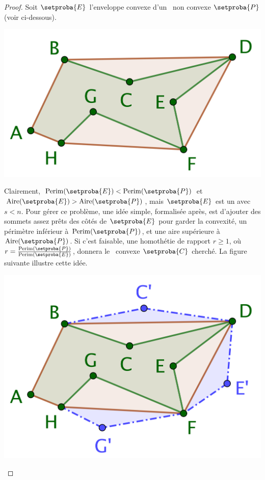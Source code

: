 \begin{proof}
	Soit $\setproba{E}$ l'enveloppe convexe d'un \ngone\ non convexe $\setproba{P}$ (voir ci-dessous).
	
	\begin{center}
		\centering
		\small\itshape
		\includegraphics[scale=.45]{content/polygon/sol-must-be/convex-hull.png}
	\end{center}
	
		
	Clairement,
	$\perim{\setproba{E}} < \perim{\setproba{P}}$
	et
	$\area{\setproba{E}} > \area{\setproba{P}}$,
	mais
	$\setproba{E}$ est un  avec $s < n$. 
	Pour gérer ce problème, une idée simple, formalisée après, est d'ajouter des sommets assez prêts des côtés de $\setproba{E}$ pour garder 
	la convexité, 
	un périmètre inférieur à $\perim{\setproba{P}}$, 
	et
	une aire supérieure à $\area{\setproba{P}}$.
	Si c'est faisable, une homothétie de rapport $r \geq 1$, où $r = \frac{ \perim{\setproba{P}} }{ \perim{\setproba{E}} }$, donnera le \ngone\ convexe $\setproba{C}$ cherché.
	La figure suivante illustre cette idée.
	
	\begin{center}
		\includegraphics[scale=.45]{content/polygon/sol-must-be/convex-hull-distortion.png}
	\end{center}


\end{proof}
